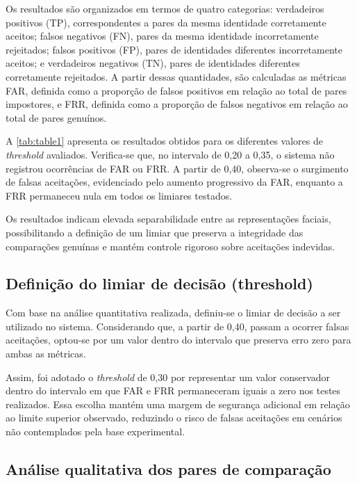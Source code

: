 Os resultados são organizados em termos de quatro categorias: verdadeiros positivos (\acs{TP}), correspondentes a pares da mesma identidade corretamente aceitos; falsos negativos (\acs{FN}), pares da mesma identidade incorretamente rejeitados; falsos positivos (\acs{FP}), pares de identidades diferentes incorretamente aceitos; e verdadeiros negativos (\acs{TN}), pares de identidades diferentes corretamente rejeitados. A partir dessas quantidades, são calculadas as métricas \acs{FAR}, definida como a proporção de falsos positivos em relação ao total de pares impostores, e \acs{FRR}, definida como a proporção de falsos negativos em relação ao total de pares genuínos.

A \ref{tab:table1} apresenta os resultados obtidos para os diferentes valores de \textit{threshold} avaliados. Verifica-se que, no intervalo de 0,20 a 0,35, o sistema não registrou ocorrências de \acs{FAR} ou \acs{FRR}. A partir de 0,40, observa-se o surgimento de falsas aceitações, evidenciado pelo aumento progressivo da \acs{FAR}, enquanto a \acs{FRR} permaneceu nula em todos os limiares testados.

Os resultados indicam elevada separabilidade entre as representações faciais, possibilitando a definição de um limiar que preserva a integridade das comparações genuínas e mantém controle rigoroso sobre aceitações indevidas.


\subsection{Definição do limiar de decisão (threshold)}

Com base na análise quantitativa realizada, definiu-se o limiar de decisão a ser utilizado no sistema. Considerando que, a partir de 0,40, passam a ocorrer falsas aceitações, optou-se por um valor dentro do intervalo que preserva erro zero para ambas as métricas.

Assim, foi adotado o \textit{threshold} de 0,30 por representar um valor conservador dentro do intervalo em que \acs{FAR} e \acs{FRR} permaneceram iguais a zero nos testes realizados. Essa escolha mantém uma margem de segurança adicional em relação ao limite superior observado, reduzindo o risco de falsas aceitações em cenários não contemplados pela base experimental.


\subsection{Análise qualitativa dos pares de comparação}

